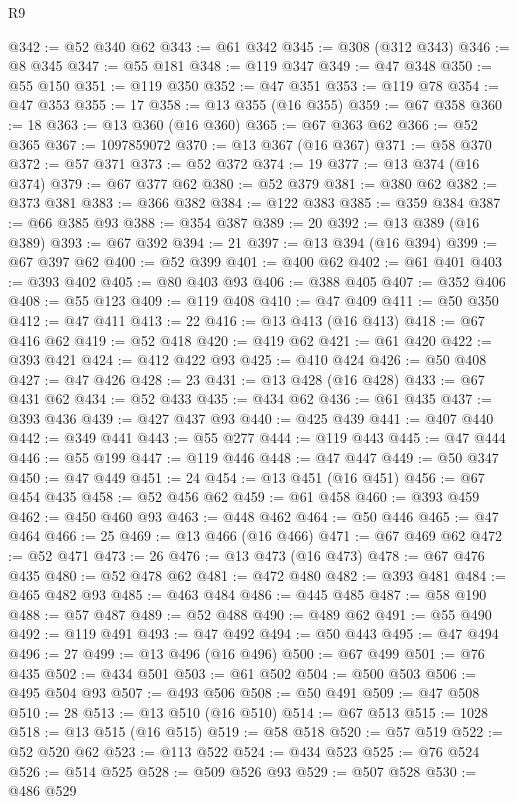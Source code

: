 \begin{lexlean}{R9}
\begin{coremodule}
@342 := @52 @340 @62
@343 := @61 @342
@345 := @308 (@312 @343)
@346 := @8 @345
@347 := @55 @181
@348 := @119 @347
@349 := @47 @348
@350 := @55 @150
@351 := @119 @350
@352 := @47 @351
@353 := @119 @78
@354 := @47 @353
@355 := 17
@358 := @13 @355 (@16 @355)
@359 := @67 @358
@360 := 18
@363 := @13 @360 (@16 @360)
@365 := @67 @363 @62
@366 := @52 @365
@367 := 1097859072
@370 := @13 @367 (@16 @367)
@371 := @58 @370
@372 := @57 @371
@373 := @52 @372
@374 := 19
@377 := @13 @374 (@16 @374)
@379 := @67 @377 @62
@380 := @52 @379
@381 := @380 @62
@382 := @373 @381
@383 := @366 @382
@384 := @122 @383
@385 := @359 @384
@387 := @66 @385 @93
@388 := @354 @387
@389 := 20
@392 := @13 @389 (@16 @389)
@393 := @67 @392
@394 := 21
@397 := @13 @394 (@16 @394)
@399 := @67 @397 @62
@400 := @52 @399
@401 := @400 @62
@402 := @61 @401
@403 := @393 @402
@405 := @80 @403 @93
@406 := @388 @405
@407 := @352 @406
@408 := @55 @123
@409 := @119 @408
@410 := @47 @409
@411 := @50 @350
@412 := @47 @411
@413 := 22
@416 := @13 @413 (@16 @413)
@418 := @67 @416 @62
@419 := @52 @418
@420 := @419 @62
@421 := @61 @420
@422 := @393 @421
@424 := @412 @422 @93
@425 := @410 @424
@426 := @50 @408
@427 := @47 @426
@428 := 23
@431 := @13 @428 (@16 @428)
@433 := @67 @431 @62
@434 := @52 @433
@435 := @434 @62
@436 := @61 @435
@437 := @393 @436
@439 := @427 @437 @93
@440 := @425 @439
@441 := @407 @440
@442 := @349 @441
@443 := @55 @277
@444 := @119 @443
@445 := @47 @444
@446 := @55 @199
@447 := @119 @446
@448 := @47 @447
@449 := @50 @347
@450 := @47 @449
@451 := 24
@454 := @13 @451 (@16 @451)
@456 := @67 @454 @435
@458 := @52 @456 @62
@459 := @61 @458
@460 := @393 @459
@462 := @450 @460 @93
@463 := @448 @462
@464 := @50 @446
@465 := @47 @464
@466 := 25
@469 := @13 @466 (@16 @466)
@471 := @67 @469 @62
@472 := @52 @471
@473 := 26
@476 := @13 @473 (@16 @473)
@478 := @67 @476 @435
@480 := @52 @478 @62
@481 := @472 @480
@482 := @393 @481
@484 := @465 @482 @93
@485 := @463 @484
@486 := @445 @485
@487 := @58 @190
@488 := @57 @487
@489 := @52 @488
@490 := @489 @62
@491 := @55 @490
@492 := @119 @491
@493 := @47 @492
@494 := @50 @443
@495 := @47 @494
@496 := 27
@499 := @13 @496 (@16 @496)
@500 := @67 @499
@501 := @76 @435
@502 := @434 @501
@503 := @61 @502
@504 := @500 @503
@506 := @495 @504 @93
@507 := @493 @506
@508 := @50 @491
@509 := @47 @508
@510 := 28
@513 := @13 @510 (@16 @510)
@514 := @67 @513
@515 := 1028
@518 := @13 @515 (@16 @515)
@519 := @58 @518
@520 := @57 @519
@522 := @52 @520 @62
@523 := @113 @522
@524 := @434 @523
@525 := @76 @524
@526 := @514 @525
@528 := @509 @526 @93
@529 := @507 @528
@530 := @486 @529

\end{coremodule}
\end{lexlean}
